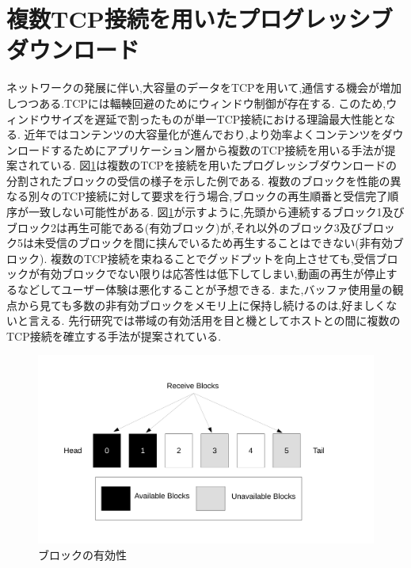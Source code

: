 \documentclass[a4j,12pt]{gradthesis_utf8}
\begin{document}
\clearpage

\section{複数TCP接続を用いたプログレッシブダウンロード}
\label{hukusu}
ネットワークの発展に伴い,大容量のデータをTCPを用いて,通信する機会が増加しつつある.TCPには輻輳回避のためにウィンドウ制御が存在する.
このため,ウィンドウサイズを遅延で割ったものが単一TCP接続における理論最大性能となる.
近年ではコンテンツの大容量化が進んでおり,より効率よくコンテンツをダウンロードするためにアプリケーション層から複数のTCP接続を用いる手法が提案されている.
図\ref{block}は複数のTCPを接続を用いたプログレッシブダウンロードの分割されたブロックの受信の様子を示した例である.
複数のブロックを性能の異なる別々のTCP接続に対して要求を行う場合,ブロックの再生順番と受信完了順序が一致しない可能性がある.
図\ref{block}が示すように,先頭から連続するブロック1及びブロック2は再生可能である(有効ブロック)が,それ以外のブロック3及びブロック5は未受信のブロックを間に挟んでいるため再生することはできない(非有効ブロック).
複数のTCP接続を束ねることでグッドプットを向上させても,受信ブロックが有効ブロックでない限りは応答性は低下してしまい,動画の再生が停止するなどしてユーザー体験は悪化することが予想できる.
また,バッファ使用量の観点から見ても多数の非有効ブロックをメモリ上に保持し続けるのは,好ましくないと言える.
先行研究では帯域の有効活用を目と機としてホストとの間に複数のTCP接続を確立する手法が提案されている\cite{hiraoka}.

\begin{figure}[h]
	\centering
	\includegraphics[width=17cm]{figure/block.pdf}
	\caption{ブロックの有効性}
	\label{block}
\end{figure}

\end{document}
